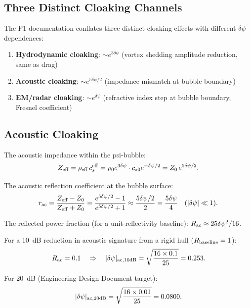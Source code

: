 \documentclass[11pt,twocolumn]{article}
\newcommand{\dpsi}{\delta\psi}
\begin{document}
\subsection{Three Distinct Cloaking Channels}

The P1 documentation conflates three distinct cloaking effects with different
$\dpsi$ dependences:
\begin{enumerate}[nosep]
\item \textbf{Hydrodynamic cloaking}: $\sim e^{3\dpsi}$ (vortex shedding
  amplitude reduction, same as drag)
\item \textbf{Acoustic cloaking}: $\sim e^{5\dpsi/2}$ (impedance mismatch
  at bubble boundary)
\item \textbf{EM/radar cloaking}: $\sim e^{\dpsi}$ (refractive index step
  at bubble boundary, Fresnel coefficient)
\end{enumerate}

\subsection{Acoustic Cloaking}

The acoustic impedance within the psi-bubble:
\begin{equation}
Z_{\rm eff} = \rho_{\rm eff}\,c_s^{\rm eff}
= \rho_0 e^{3\dpsi}\cdot c_{s0} e^{-\dpsi/2} = Z_0\,e^{5\dpsi/2}.
\end{equation}

The acoustic reflection coefficient at the bubble surface:
\begin{equation}
r_{\rm ac} = \frac{Z_{\rm eff} - Z_0}{Z_{\rm eff} + Z_0}
= \frac{e^{5\dpsi/2} - 1}{e^{5\dpsi/2} + 1}
\approx \frac{5\dpsi/2}{2} = \frac{5\dpsi}{4}
\quad (|\dpsi| \ll 1).
\label{eq:r_acoustic}
\end{equation}

The reflected power fraction (for a unit-reflectivity baseline):
$R_{\rm ac} \approx 25\dpsi^2/16$.

For a 10~dB reduction in acoustic signature from a rigid hull ($R_{\rm baseline}
= 1$):
\begin{equation}
R_{\rm ac} = 0.1 \quad\Rightarrow\quad
|\dpsi|_{\rm ac,10dB} = \sqrt{\frac{16\times0.1}{25}} = 0.253.
\label{eq:dpsi_acoustic}
\end{equation}

For 20~dB (Engineering Design Document target):
\begin{equation}
|\dpsi|_{\rm ac,20dB} = \sqrt{\frac{16\times0.01}{25}} = 0.0800.
\end{equation}
\end{document}
